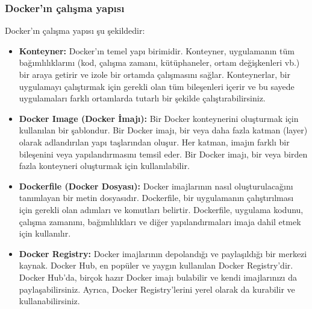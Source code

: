 \subsubsection{Docker'ın çalışma yapısı }
Docker'ın çalışma yapısı şu şekildedir:
\begin{itemize}
\item \textbf{Konteyner:} Docker'ın temel yapı birimidir. Konteyner, uygulamanın tüm bağımlılıklarını (kod, çalışma zamanı, kütüphaneler, ortam değişkenleri vb.) bir araya getirir ve izole bir ortamda çalışmasını sağlar. Konteynerlar, bir uygulamayı çalıştırmak için gerekli olan tüm bileşenleri içerir ve bu sayede uygulamaları farklı ortamlarda tutarlı bir şekilde çalıştırabilirsiniz.

\item \textbf{Docker Image (Docker İmajı):} Bir Docker konteynerini oluşturmak için kullanılan bir şablondur. Bir Docker imajı, bir veya daha fazla katman (layer) olarak adlandırılan yapı taşlarından oluşur. Her katman, imajın farklı bir bileşenini veya yapılandırmasını temsil eder. Bir Docker imajı, bir veya birden fazla konteyneri oluşturmak için kullanılabilir.

\item  \textbf{Dockerfile (Docker Dosyası):} Docker imajlarının nasıl oluşturulacağını tanımlayan bir metin dosyasıdır. Dockerfile, bir uygulamanın çalıştırılması için gerekli olan adımları ve komutları belirtir. Dockerfile, uygulama kodunu, çalışma zamanını, bağımlılıkları ve diğer yapılandırmaları imaja dahil etmek için kullanılır.

\item \textbf{Docker Registry:} Docker imajlarının depolandığı ve paylaşıldığı bir merkezi kaynak. Docker Hub, en popüler ve yaygın kullanılan Docker Registry'dir. Docker Hub'da, birçok hazır Docker imajı bulabilir ve kendi imajlarınızı da paylaşabilirsiniz. Ayrıca, Docker Registry'lerini yerel olarak da kurabilir ve kullanabilirsiniz.
\end{itemize}

